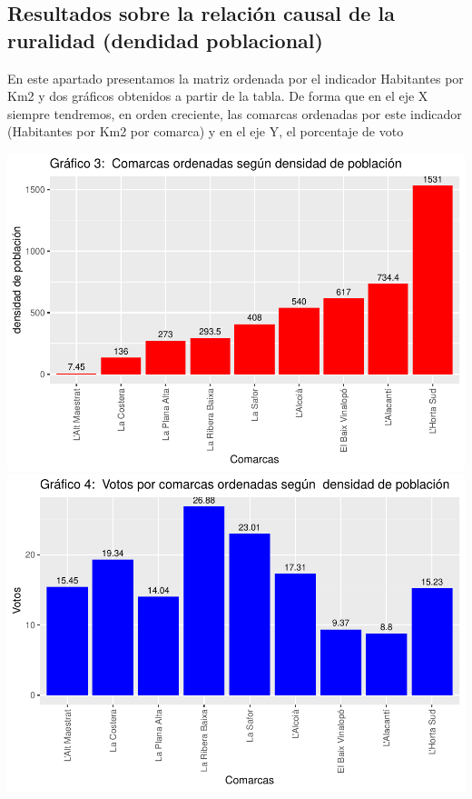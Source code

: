 \documentclass[
]{article}
\begin{document}
\hypertarget{resultados-sobre-la-relaciuxf3n-causal-de-la-ruralidad-dendidad-poblacional}{%
\subsection{Resultados sobre la relación causal de la ruralidad
(dendidad
poblacional)}\label{resultados-sobre-la-relaciuxf3n-causal-de-la-ruralidad-dendidad-poblacional}}

En este apartado presentamos la matriz ordenada por el indicador
Habitantes por Km2 y dos gráficos obtenidos a partir de la tabla. De
forma que en el eje X siempre tendremos, en orden creciente, las
comarcas ordenadas por este indicador (Habitantes por Km2 por comarca) y
en el eje Y, el porcentaje de voto

\includegraphics{votovalencianista-ea2023_page_files/figure-latex/ordenDensidadpoblacional-1.pdf}
\includegraphics{votovalencianista-ea2023_page_files/figure-latex/ordenDensidadpoblacional-2.pdf}
\end{document}
